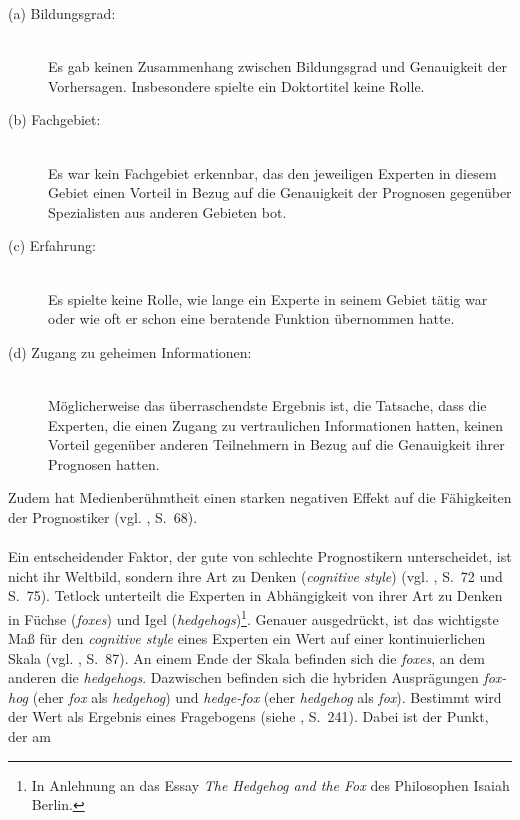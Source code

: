 \begin{description}

\item[(a) Bildungsgrad:] \hfill \\
Es gab keinen Zusammenhang zwischen Bildungsgrad und Genauigkeit der Vorhersagen.
Insbesondere spielte ein Doktortitel keine Rolle.

\item[(b) Fachgebiet:] \hfill \\
Es war kein Fachgebiet erkennbar, das den jeweiligen Experten in diesem Gebiet
einen Vorteil in Bezug auf die Genauigkeit der Prognosen gegenüber Spezialisten
aus anderen Gebieten bot.

\item[(c) Erfahrung:] \hfill \\
Es spielte keine Rolle, wie lange ein Experte in seinem Gebiet tätig war oder
wie oft er schon eine beratende Funktion übernommen hatte.

\item[(d) Zugang zu geheimen Informationen:] \hfill \\
Möglicherweise das überraschendste Ergebnis ist, die Tatsache, dass die Experten,
die einen Zugang zu vertraulichen Informationen hatten, keinen Vorteil gegenüber
anderen Teilnehmern in Bezug auf die Genauigkeit ihrer Prognosen hatten.

\end{description}
Zudem hat Medienberühmtheit einen starken negativen Effekt auf die Fähigkeiten
der Prognostiker (vgl. \cite{Tetlock}, S.~68). \\ \\
Ein entscheidender Faktor, der gute von schlechte Prognostikern unterscheidet,
ist nicht ihr Weltbild, sondern ihre Art zu Denken (\emph{cognitive style})
(vgl. \cite{Tetlock}, S.~72 und S.~75). Tetlock unterteilt die Experten in
Abhängigkeit von ihrer Art zu Denken in Füchse (\emph{foxes}) und Igel
(\emph{hedgehogs})\footnote{
In Anlehnung an das Essay \emph{The Hedgehog and the Fox} des Philosophen Isaiah
Berlin.
}. Genauer ausgedrückt, ist das wichtigste Maß für den \emph{cognitive style}
eines Experten ein Wert auf einer kontinuierlichen Skala (vgl. \cite{Tetlock},
S.~87). An einem Ende der Skala befinden sich die \emph{foxes}, an dem anderen
die \emph{hedgehogs}. Dazwischen befinden sich die hybriden Ausprägungen
\emph{fox-hog} (eher \emph{fox} als \emph{hedgehog}) und \emph{hedge-fox} (eher
\emph{hedgehog} als \emph{fox}). Bestimmt wird der Wert als Ergebnis eines
Fragebogens (siehe \cite{Tetlock}, S.~241). Dabei ist der Punkt, der am
